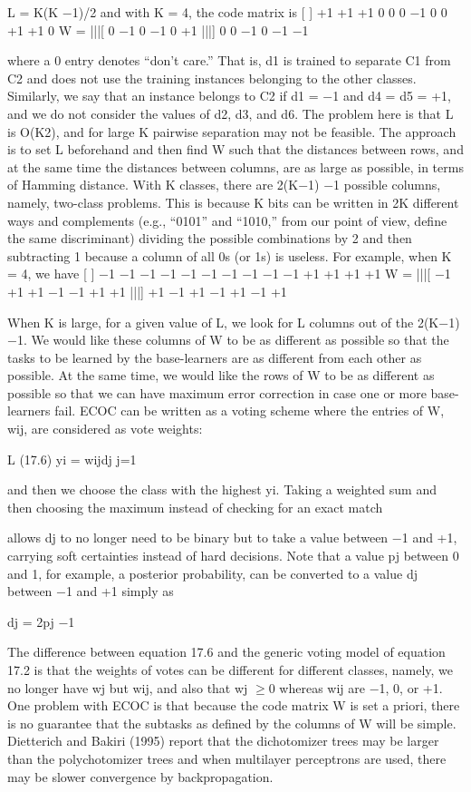L = K(K $-$1)/2 and with K = 4, the code matrix is [ ] +1 +1 +1 0 0 0 $-$1 0 0 +1 +1 0 W = |||[ 0 $-$1 0 $-$1 0 +1 |||] 0 0 $-$1 0 $-$1 $-$1

where a 0 entry denotes “don’t care.” That is, d1 is trained to separate C1 from C2 and does not use the training instances belonging to the other classes. Similarly, we say that an instance belongs to C2 if d1 = $-$1 and d4 = d5 = +1, and we do not consider the values of d2, d3, and d6. The problem here is that L is O(K2), and for large K pairwise separation may not be feasible. The approach is to set L beforehand and then find W such that the distances between rows, and at the same time the distances between columns, are as large as possible, in terms of Hamming distance. With K classes, there are 2(K$-$1) $-$1 possible columns, namely, two-class problems. This is because K bits can be written in 2K different ways and complements (e.g., “0101” and “1010,” from our point of view, define the same discriminant) dividing the possible combinations by 2 and then subtracting 1 because a column of all 0s (or 1s) is useless. For example, when K = 4, we have [ ] $-$1 $-$1 $-$1 $-$1 $-$1 $-$1 $-$1 $-$1 $-$1 $-$1 +1 +1 +1 +1 W = |||[ $-$1 +1 +1 $-$1 $-$1 +1 +1 |||] +1 $-$1 +1 $-$1 +1 $-$1 +1

When K is large, for a given value of L, we look for L columns out of the 2(K$-$1)$-$1. We would like these columns of W to be as different as possible so that the tasks to be learned by the base-learners are as different from each other as possible. At the same time, we would like the rows of W to be as different as possible so that we can have maximum error correction in case one or more base-learners fail. ECOC can be written as a voting scheme where the entries of W, wij, are considered as vote weights:

L (17.6) yi = wijdj j=1

and then we choose the class with the highest yi. Taking a weighted sum and then choosing the maximum instead of checking for an exact match

allows dj to no longer need to be binary but to take a value between $-$1 and +1, carrying soft certainties instead of hard decisions. Note that a value pj between 0 and 1, for example, a posterior probability, can be converted to a value dj between $-$1 and +1 simply as

dj = 2pj $-$1

The difference between equation 17.6 and the generic voting model of equation 17.2 is that the weights of votes can be different for different classes, namely, we no longer have wj but wij, and also that wj $\geq$0 whereas wij are $-$1, 0, or +1. One problem with ECOC is that because the code matrix W is set a priori, there is no guarantee that the subtasks as defined by the columns of W will be simple. Dietterich and Bakiri (1995) report that the dichotomizer trees may be larger than the polychotomizer trees and when multilayer perceptrons are used, there may be slower convergence by backpropagation.

